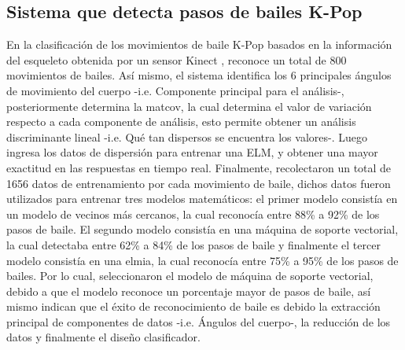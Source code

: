\subsection{Sistema que detecta pasos de bailes K-Pop} \label{tr:9} 
En la clasificaci\'on de los movimientos de baile K-Pop basados en la informaci\'on del esqueleto obtenida por un sensor Kinect \cite{kim2017classification}, reconoce un total de 800 movimientos de bailes.
\medbreak 
As\'i mismo, el sistema identifica los 6 principales \'angulos de movimiento del cuerpo -i.e. Componente principal para el an\'alisis-, posteriormente determina la \gls{matcov}, la cual determina el valor de variaci\'on respecto a cada componente de an\'alisis,  esto permite obtener un an\'alisis discriminante lineal -i.e. Qu\'e tan dispersos se encuentra los valores-.
\medbreak 
Luego ingresa los datos de dispersi\'on para entrenar una  \acrfull{ELM}, y obtener una mayor exactitud en las respuestas en tiempo real.
\medbreak 
Finalmente,  recolectaron un total de 1656 datos de entrenamiento por cada movimiento de baile, dichos datos fueron utilizados para entrenar tres modelos matem\'aticos: el primer modelo consist\'ia en un modelo de vecinos m\'as cercanos, la cual reconoc\'ia entre 88\% a 92\% de los pasos de baile. El segundo modelo consist\'ia en una m\'aquina de soporte vectorial, la cual detectaba entre 62\% a 84\% de los pasos de baile y finalmente el tercer modelo consist\'ia en una \gls{elmia}, la cual reconoc\'ia entre 75\% a 95\% de los pasos de bailes.
\medbreak 
Por lo cual,   seleccionaron el modelo de m\'aquina de soporte vectorial, debido a que el modelo reconoce un porcentaje mayor de pasos de baile, as\'i mismo indican que el \'exito de reconocimiento de baile es debido la extracci\'on principal de componentes de datos -i.e. \'Angulos del cuerpo-, la reducci\'on de los datos y finalmente  el dise\~no clasificador.
